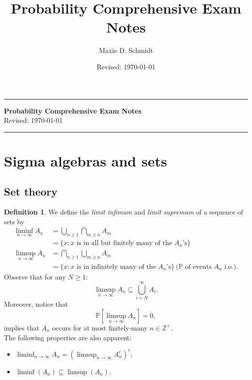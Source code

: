 \documentclass[12pt,reqno]{article}
\title{Probability Comprehensive Exam Notes}
\author{Maxie D. Schmidt}
\date{Revised: \today}
\renewcommand{\emph}[1]{\textit{#1}}
\theoremstyle{plain}
\theoremstyle{definition}
\newtheorem{definition}[theorem]{Definition}
\begin{document}
\vskip -0.45in
\noindent 
\rule{\textwidth}{0.1cm} 

\begin{center} 
{\normalfont\sffamily\Large\bf Probability Comprehensive Exam Notes} \\[0.25cm]  
{\normalfont\sffamily\large Revised: \today}
\end{center}

\noindent 
\rule{\textwidth}{0.1cm} 

\vskip -0.75in
\def\contentsname{\large{Topics Index}}
\setcounter{secnumdepth}{2}
\renewcommand{\baselinestretch}{0.55}\normalsize
\tableofcontents
\renewcommand{\baselinestretch}{1.0}\normalsize

\newpage
\section{Sigma algebras and sets} 

\subsection{Set theory} 

\begin{definition} 
We define the \emph{limit infimum} and \emph{limit supremum} of a sequence of sets by 
\begin{align*} 
\liminf_{n \rightarrow \infty} A_n & = \bigcup_{n \geq 1} \bigcap_{m \geq n} 
     A_m \\ 
     & = \{x: \text{$x$ is in all but finitely many of the $A_n$'s}\} \\ 
\limsup_{n \rightarrow \infty} A_n & = \bigcap_{n \geq 1} \bigcup_{m \geq n} 
     A_m \\ 
     & = \{x: \text{$x$ is in infinitely many of the $A_n$'s}\}\ \text{($\mathbb{P}$ of events $A_n$ i.o.)}. 
\end{align*} 
Observe that for any $N \geq 1$:
$$\limsup_{n \rightarrow \infty} A_n \subseteq \bigcup_{i=N}^{\infty} A_i.$$
Moreover, notice that 
\[
\mathbb{P}\left[\limsup_{n \rightarrow \infty} A_n\right] = 0, 
\]
implies that $A_n$ occurs for at most finitely-many $n \in \mathbb{Z}^{+}$. \\ 
The following properties are also apparent:
\begin{itemize} 

\item $\liminf_{n \rightarrow \infty} A_n = 
       \left(\limsup_{n \rightarrow \infty} A_n^c\right)^c$; 
\item $\liminf(A_n) \subseteq \limsup(A_n)$. 

\end{itemize} 
\end{definition} 
\end{document}
